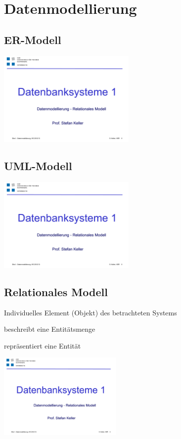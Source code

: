 \section{Datenmodellierung}
    \begin{multicols}{2}
        \subsection{ER-Modell}
            \includegraphics[page=16,trim=20 120 20 140,clip=true,width=0.5\textwidth]{images/datenmodellierung.pdf}
        \subsection{UML-Modell}
            \includegraphics[page=29,trim=20 30 20 85,clip=true,width=0.5\textwidth]{images/datenmodellierung.pdf}
    \end{multicols}
    \begin{multicols}{2}        
        \subsection{Relationales Modell}
            \begin{description}
            \setlength{\itemsep}{0pt}    
                \item[Entitität] Individuelles Element (Objekt) des betrachteten Systems
                \item[Relation] beschreibt eine Entitätsmenge
                \item[Tupel] repräsentiert eine Entität
            \end{description}
            \includegraphics[page=42,trim=10 30 0 84,clip=true,width=0.45\textwidth]{images/datenmodellierung.pdf}
    \end{multicols}    
